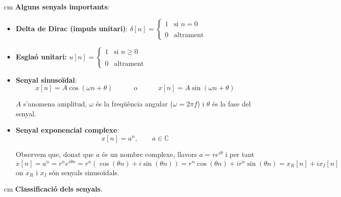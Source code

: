 \documentclass{article}
\newcommand\C{\mathbb{C}}
\begin{document}
 cm
\noindent
\textbf{Alguns senyals importants}:
\begin{itemize}
\item \textbf{Delta de Dirac (impuls unitari)}: $\delta[n]=\begin{cases} 1 & \text{si } n=0 \\ \\ 0 & \text{altrament} \end{cases}$
\item \textbf{Esgla\'o unitari:} $u[n]=\begin{cases} 1 & \text{si } n \geq 0 \\ \\ 0 & \text{altrament} \end{cases}$
\item \textbf{Senyal sinuso\"idal}:
\[
x[n]=A \cos(\omega n + \theta) \qquad \quad  \text{o}  \qquad \quad x[n]=A \sin(\omega n + \theta)
\]

\noindent
$A$ s'anomena amplitud, $\omega$ \'es la freq\"u\`encia angular ($\omega=2\pi f$) i $\theta$ \'es
la fase del senyal.

\item \textbf{Senyal exponencial complexe}:
\[
x[n]=a^n , \qquad a \in \C
\]

\noindent
Observem que, donat que $a$ \'es un nombre complexe, llavors $a=r e^{i\theta}$ i per tant
\[
x[n]=a^n = r^n e^{i \theta n} = r^n (\cos(\theta n) + i \sin(\theta n)) = r^n \cos(\theta n) + i r^n \sin(\theta n)=x_R[n]+i x_I[n]
\]
\noindent
on $x_R$ i $x_I$ s\'on senyals sinuso\"idals.

\end{itemize}

 cm
\noindent
\textbf{Classificaci\'o dels senyals}. 
\end{document}
